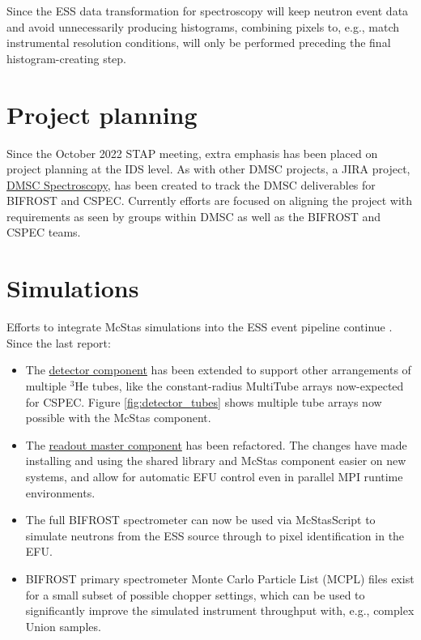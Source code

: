 \documentclass[a4paper, twocolumn, 10pt, revision]{ess}
\begin{document}
Since the ESS data transformation for spectroscopy will keep neutron event data and avoid unnecessarily producing histograms, 
combining pixels to, e.g., match instrumental resolution conditions, will only be performed preceding the final histogram-creating step.


\section{Project planning}
Since the October 2022 STAP meeting, extra emphasis has been placed on project planning at the IDS level.
As with other DMSC projects, a JIRA project,
\href{https://jira.esss.lu.se/projects/DMSCSPEC}{DMSC Spectroscopy},
has been created to track the DMSC deliverables for BIFROST and CSPEC.
Currently efforts are focused on aligning the project with requirements as seen by groups within DMSC as well as the BIFROST and CSPEC teams.


\section{Simulations}
Efforts to integrate McStas simulations into the ESS event pipeline continue \autocite{tucker_spectroscopy_stap_october_2022}.
Since the last report:
\begin{itemize}
\item The \href{https://github.com/g5t/mcstas-detector-tubes}{detector component}
      has been extended to support other arrangements of multiple $^3$He tubes,
      like the constant-radius MultiTube arrays now-expected for CSPEC.
      Figure \ref{fig:detector_tubes} shows multiple tube arrays now possible with the McStas component.
\item The \href{https://github.com/g5t/mcstas-readout-master}{readout master component}
      has been refactored. 
      The changes have made installing and using the shared library and McStas component easier on new systems,
      and allow for automatic EFU control even in parallel MPI runtime environments.
\item The full BIFROST spectrometer can now be used via McStasScript to simulate neutrons from the ESS source through to pixel identification in the EFU.
\item BIFROST primary spectrometer Monte Carlo Particle List (MCPL) files exist for a small subset of possible chopper settings,
      which can be used to significantly improve the simulated instrument throughput with, e.g., complex Union samples.
\end{itemize}
\end{document}
